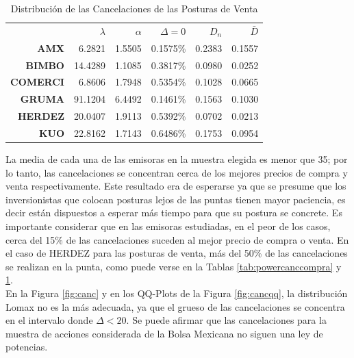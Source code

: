 \documentclass[11pt]{article}
\numberwithin{equation}{section} %
\begin{document}
\begin{table}[htbp]
\centering
\caption{Distribución de las Cancelaciones de las Posturas de Venta}
\renewcommand{\arraystretch}{1.2}
\begin{tabular}{r|r|r|r|r|r|}
\cline{2-6}
& $\lambda$ & $\alpha$ & $\Delta=0$ & $D_n$ & $\bar{D}$ \\
\cline{2-6}
\textbf{AMX}   & 6.2821 & 1.5505 & 0.1575\% & 0.2383 & 0.1557 \\
\textbf{BIMBO} & 14.4289 & 1.1085 & 0.3817\% & 0.0980 & 0.0252 \\
\textbf{COMERCI}   & 6.8606 & 1.7948 & 0.5354\% & 0.1028 & 0.0665 \\
\textbf{GRUMA} & 91.1204 & 6.4492 & 0.1461\% & 0.1563 & 0.1030 \\
\textbf{HERDEZ}   & 20.0407 & 1.9113 & 0.5392\% & 0.0702 & 0.0213 \\
\textbf{KUO}   & 22.8162 & 1.7143 & 0.6486\% & 0.1753 & 0.0954 \\
\cline{2-6}
\end{tabular}%
\label{tab:powercancventa}%
\end{table}%

La media de cada una de las emisoras en la muestra elegida es menor que 35; por lo tanto, las cancelaciones se concentran cerca de los mejores precios de compra y venta respectivamente. Este resultado era de esperarse ya que se presume que los inversionistas que colocan posturas lejos de las puntas tienen mayor paciencia, es decir están dispuestos a esperar más tiempo para que su postura se concrete.  Es importante considerar que en las emisoras estudiadas, en el peor de los casos, cerca del 15\% de las cancelaciones suceden al mejor precio de compra o venta. En el caso de HERDEZ para las posturas de venta, más del 50\% de las cancelaciones se realizan en la punta, como puede verse en la Tablas \ref{tab:powercanccompra} y \ref{tab:powercancventa}.\\

En la Figura \ref{fig:canc} y en los QQ-Plots de la Figura \ref{fig:cancqq}, la distribución Lomax no es la más adecuada, ya que el grueso de las cancelaciones se concentra en el intervalo donde $\Delta<20$. Se puede afirmar que las cancelaciones para la muestra de acciones considerada de la Bolsa Mexicana no siguen una ley de potencias.

\clearpage
\end{document}
